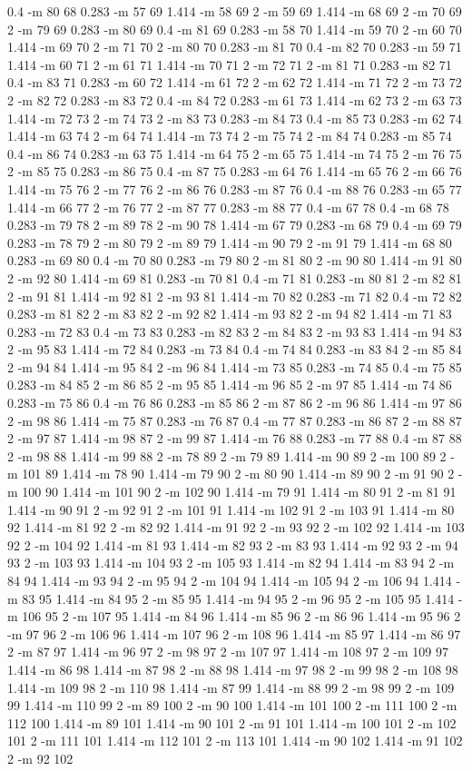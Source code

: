 \documentclass[12pt]{article}
\begin{document}
0.4 -m 80 68 0.283 -m 57 69 1.414 -m 58 69 2 -m 59 69 1.414 -m 68 69 2 -m 70 69 2 -m 79 69 0.283 -m 80 69 0.4 -m 81 69 0.283 -m 58 70 1.414 -m 59 70 2 -m 60 70 1.414 -m 69 70 2 -m 71 70 2 -m 80 70 0.283 -m 81 70 0.4 -m 82 70 0.283 -m 59 71 1.414 -m 60 71 2 -m 61 71 1.414 -m 70 71 2 -m 72 71 2 -m 81 71 0.283 -m 82 71 0.4 -m 83 71 0.283 -m 60 72 1.414 -m 61 72 2 -m 62 72 1.414 -m 71 72 2 -m 73 72 2 -m 82 72 0.283 -m 83 72 0.4 -m 84 72 0.283 -m 61 73 1.414 -m 62 73 2 -m 63 73 1.414 -m 72 73 2 -m 74 73 2 -m 83 73 0.283 -m 84 73 0.4 -m 85 73 0.283 -m 62 74 1.414 -m 63 74 2 -m 64 74 1.414 -m 73 74 2 -m 75 74 2 -m 84 74 0.283 -m 85 74 0.4 -m 86 74 0.283 -m 63 75 1.414 -m 64 75 2 -m 65 75 1.414 -m 74 75 2 -m 76 75 2 -m 85 75 0.283 -m 86 75 0.4 -m 87 75 0.283 -m 64 76 1.414 -m 65 76 2 -m 66 76 1.414 -m 75 76 2 -m 77 76 2 -m 86 76 0.283 -m 87 76 0.4 -m 88 76 0.283 -m 65 77 1.414 -m 66 77 2 -m 76 77 2 -m 87 77 0.283 -m 88 77 0.4 -m 67 78 0.4 -m 68 78 0.283 -m 79 78 2 -m 89 78 2 -m 90 78 1.414 -m 67 79 0.283 -m 68 79 0.4 -m 69 79 0.283 -m 78 79 2 -m 80 79 2 -m 89 79 1.414 -m 90 79 2 -m 91 79 1.414 -m 68 80 0.283 -m 69 80 0.4 -m 70 80 0.283 -m 79 80 2 -m 81 80 2 -m 90 80 1.414 -m 91 80 2 -m 92 80 1.414 -m 69 81 0.283 -m 70 81 0.4 -m 71 81 0.283 -m 80 81 2 -m 82 81 2 -m 91 81 1.414 -m 92 81 2 -m 93 81 1.414 -m 70 82 0.283 -m 71 82 0.4 -m 72 82 0.283 -m 81 82 2 -m 83 82 2 -m 92 82 1.414 -m 93 82 2 -m 94 82 1.414 -m 71 83 0.283 -m 72 83 0.4 -m 73 83 0.283 -m 82 83 2 -m 84 83 2 -m 93 83 1.414 -m 94 83 2 -m 95 83 1.414 -m 72 84 0.283 -m 73 84 0.4 -m 74 84 0.283 -m 83 84 2 -m 85 84 2 -m 94 84 1.414 -m 95 84 2 -m 96 84 1.414 -m 73 85 0.283 -m 74 85 0.4 -m 75 85 0.283 -m 84 85 2 -m 86 85 2 -m 95 85 1.414 -m 96 85 2 -m 97 85 1.414 -m 74 86 0.283 -m 75 86 0.4 -m 76 86 0.283 -m 85 86 2 -m 87 86 2 -m 96 86 1.414 -m 97 86 2 -m 98 86 1.414 -m 75 87 0.283 -m 76 87 0.4 -m 77 87 0.283 -m 86 87 2 -m 88 87 2 -m 97 87 1.414 -m 98 87 2 -m 99 87 1.414 -m 76 88 0.283 -m 77 88 0.4 -m 87 88 2 -m 98 88 1.414 -m 99 88 2 -m 78 89 2 -m 79 89 1.414 -m 90 89 2 -m 100 89 2 -m 101 89 1.414 -m 78 90 1.414 -m 79 90 2 -m 80 90 1.414 -m 89 90 2 -m 91 90 2 -m 100 90 1.414 -m 101 90 2 -m 102 90 1.414 -m 79 91 1.414 -m 80 91 2 -m 81 91 1.414 -m 90 91 2 -m 92 91 2 -m 101 91 1.414 -m 102 91 2 -m 103 91 1.414 -m 80 92 1.414 -m 81 92 2 -m 82 92 1.414 -m 91 92 2 -m 93 92 2 -m 102 92 1.414 -m 103 92 2 -m 104 92 1.414 -m 81 93 1.414 -m 82 93 2 -m 83 93 1.414 -m 92 93 2 -m 94 93 2 -m 103 93 1.414 -m 104 93 2 -m 105 93 1.414 -m 82 94 1.414 -m 83 94 2 -m 84 94 1.414 -m 93 94 2 -m 95 94 2 -m 104 94 1.414 -m 105 94 2 -m 106 94 1.414 -m 83 95 1.414 -m 84 95 2 -m 85 95 1.414 -m 94 95 2 -m 96 95 2 -m 105 95 1.414 -m 106 95 2 -m 107 95 1.414 -m 84 96 1.414 -m 85 96 2 -m 86 96 1.414 -m 95 96 2 -m 97 96 2 -m 106 96 1.414 -m 107 96 2 -m 108 96 1.414 -m 85 97 1.414 -m 86 97 2 -m 87 97 1.414 -m 96 97 2 -m 98 97 2 -m 107 97 1.414 -m 108 97 2 -m 109 97 1.414 -m 86 98 1.414 -m 87 98 2 -m 88 98 1.414 -m 97 98 2 -m 99 98 2 -m 108 98 1.414 -m 109 98 2 -m 110 98 1.414 -m 87 99 1.414 -m 88 99 2 -m 98 99 2 -m 109 99 1.414 -m 110 99 2 -m 89 100 2 -m 90 100 1.414 -m 101 100 2 -m 111 100 2 -m 112 100 1.414 -m 89 101 1.414 -m 90 101 2 -m 91 101 1.414 -m 100 101 2 -m 102 101 2 -m 111 101 1.414 -m 112 101 2 -m 113 101 1.414 -m 90 102 1.414 -m 91 102 2 -m 92 102 
\end{document}

